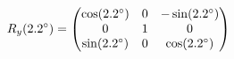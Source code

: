 \documentclass[preview]{standalone}
\begin{document}
\begin{align*}
\special{dvisvgm:raw <g id='unique000'>}R_y(2.2^\circ) = \begin{pmatrix} \cos(2.2^\circ) & 0 & -\sin(2.2^\circ) \\ 0 & 1 & 0 \\ \sin(2.2^\circ) & 0 & \cos(2.2^\circ) \end{pmatrix}\special{dvisvgm:raw </g>}
\end{align*}
\end{document}
